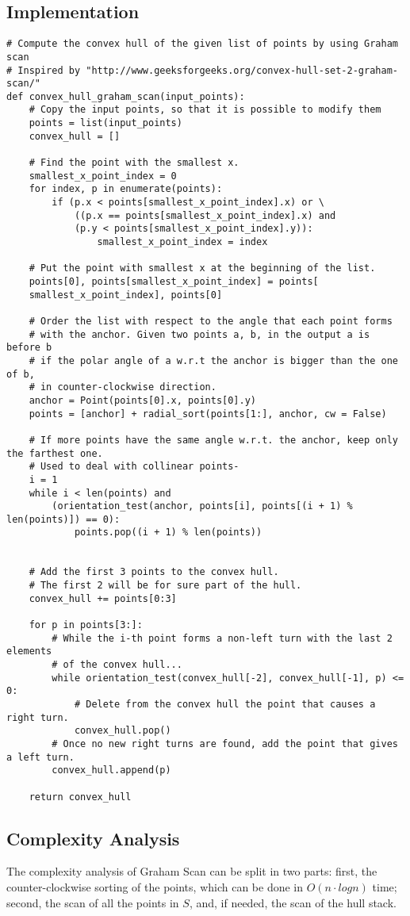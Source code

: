 \documentclass[
12pt,
a4paper,
oneside,
headinclude,
footinclude]{report}
\theoremstyle{definition} %
\begin{document}
\newpage
\subsection{Implementation}
\begin{verbatim}
# Compute the convex hull of the given list of points by using Graham scan
# Inspired by "http://www.geeksforgeeks.org/convex-hull-set-2-graham-scan/"
def convex_hull_graham_scan(input_points):
	# Copy the input points, so that it is possible to modify them
	points = list(input_points)
	convex_hull = []
	
	# Find the point with the smallest x.
	smallest_x_point_index = 0
	for index, p in enumerate(points):
		if (p.x < points[smallest_x_point_index].x) or \
			((p.x == points[smallest_x_point_index].x) and
			(p.y < points[smallest_x_point_index].y)):
				smallest_x_point_index = index
	
	# Put the point with smallest x at the beginning of the list.
	points[0], points[smallest_x_point_index] = points[
	smallest_x_point_index], points[0]
	
	# Order the list with respect to the angle that each point forms 
	# with the anchor. Given two points a, b, in the output a is before b
	# if the polar angle of a w.r.t the anchor is bigger than the one of b,
	# in counter-clockwise direction.
	anchor = Point(points[0].x, points[0].y)
	points = [anchor] + radial_sort(points[1:], anchor, cw = False)
	
	# If more points have the same angle w.r.t. the anchor, keep only the farthest one.
	# Used to deal with collinear points-
	i = 1
	while i < len(points) and 
		(orientation_test(anchor, points[i], points[(i + 1) % len(points)]) == 0):
			points.pop((i + 1) % len(points))
	
	
	# Add the first 3 points to the convex hull.
	# The first 2 will be for sure part of the hull.
	convex_hull += points[0:3]
	
	for p in points[3:]:
		# While the i-th point forms a non-left turn with the last 2 elements 
		# of the convex hull...
		while orientation_test(convex_hull[-2], convex_hull[-1], p) <= 0:
			# Delete from the convex hull the point that causes a right turn.
			convex_hull.pop()
		# Once no new right turns are found, add the point that gives a left turn.   
		convex_hull.append(p)
	
	return convex_hull
\end{verbatim}


\subsection{Complexity Analysis}
The complexity analysis of Graham Scan can be split in two parts:
first, the counter-clockwise sorting of the points, which can be done in $O(n\cdot log n)$ time; second, the scan of all the points in $S$, and, if needed, the scan of the hull stack.\\
 
\end{document}
